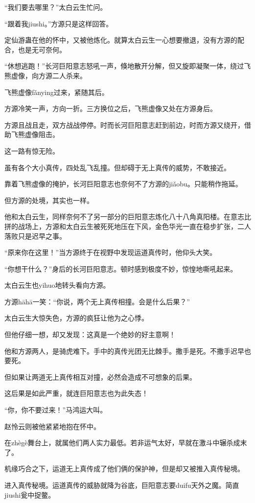 \begin{this_body}
“我们要去哪里？”太白云生忙问。

“跟着我jiushi。”方源只是这样回答。

定仙游蛊在他的怀中，又被他炼化。就算太白云生一心想要撤退，没有方源的配合，也是无可奈何。

“休想逃跑！”长河巨阳意志怒吼一声，倏地散开分解，但又旋即凝聚一体，绕过飞熊虚像，向方源二人杀来。

飞熊虚像fǎnying过来，紧随其后。

方源冷笑一声，方向一折。三方换位之后，飞熊虚像又处在方源身后。

方源且战且走，双方战战停停。时而长河巨阳意志赶到前边，时而方源又绕开，借助飞熊虚像阻击。

这一路有惊无险。

虽有各个大小真传，四处乱飞乱撞。但却碍于无上真传的威势，不敢接近。

靠着飞熊虚像的掩护，长河巨阳意志也奈何不了方源的jiǎobu。只能稍作拖延。

但方源的处境，其实也一样。

他和太白云生，同样奈何不了另一部分的巨阳意志炼化八十八角真阳楼。在意志比拼的战场上，方源和太白云生被死死地压在下风，金色华光一直在稳步扩张，二人落败只是迟早之事。

“原来你在这里！”当方源终于在视野中发现运道真传时，他仰头大笑。

“你想干什么？”身后的长河巨阳意志。顿时感到极度不妙，惊惶地嘶吼起来。

太白云生也yihuo地转头看向方源。

方源hāhā一笑：“你说，两个无上真传相撞。会是什么后果？”

太白云生大惊失色，方源的疯狂让他为之心悸。

但他仔细一想，却又发现：这真是一个绝妙的好主意啊！

他和方源两人，是骑虎难下。手中的真传光团无比棘手。撒手是死。不撒手迟早也要死。

但如果让两道无上真传相互对撞，必然会造成不可想象的后果。

这后果是如此严重，就连巨阳意志也为此失态！

“你，你不要过来！”马鸿运大叫。

赵怜云则被他紧紧地抱在怀中。

在zhègè舞台上，就属他们两人实力最低。若非运气太好，早就在激斗中辗杀成末了。

机缘巧合之下，运道无上真传成了他们俩的保护神，但是却又被推入真传秘境。

进入真传秘境。运道真传的威胁就降为谷底，巨阳意志要duifu天外之魔。简直jiushi瓮中捉鳖。


\end{this_body}
